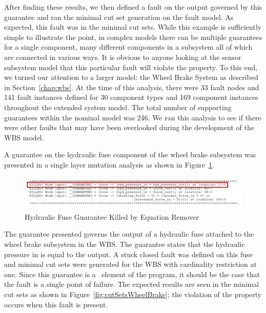 After finding these results, we then defined a fault on the output governed by this guarantee and ran the minimal cut set generation on the fault model. As expected, this fault was in the minimal cut sets. While this example is sufficiently simple to illustrate the point, in complex models there can be multiple guarantees for a single component, many different components in a subsystem all of which are connected in various ways. It is obvious to anyone looking at the sensor subsystem model that this particular fault will violate the property. To this end, we turned our attention to a larger model: the Wheel Brake System as described in Section~\ref{chap:wbs}. At the time of this analysis, there were 33 fault nodes and 141 fault instances defined for 30 component types and 169 component instances throughout the extended system model. The total number of supporting guarantees within the nominal model was 246. We ran this analysis to see if there were other faults that may have been overlooked during the development of the WBS model. 

A guarantee on the hydraulic fuse component of the wheel brake subsystem was presented in a single layer mutation analysis as shown in Figure~\ref{fig:wheelBrakeGuaranteeKilled}. 

\begin{figure}[h]
	\begin{center}
		\includegraphics[scale=0.8]{images/wheelBrakeGuaranteesKilled.PNG}
	\end{center}
	\caption{Hydraulic Fuse Guarantee Killed by Equation Remover}
	\label{fig:wheelBrakeGuaranteeKilled}
\end{figure}

The guarantee presented governs the output of a hydraulic fuse attached to the wheel brake subsystem in the WBS. The guarantee states that the hydraulic pressure in is equal to the output. A stuck closed fault was defined on this fuse and minimal cut sets were generated for the WBS with cardinality restriction at one. Since this guarantee is a \mustcov\ element of the program, it should be the case that the fault is a single point of failure. The expected results are seen in the minimal cut sets as shown in Figure~\ref{fig:cutSetsWheelBrake}; the violation of the property occurs when this fault is present. 

